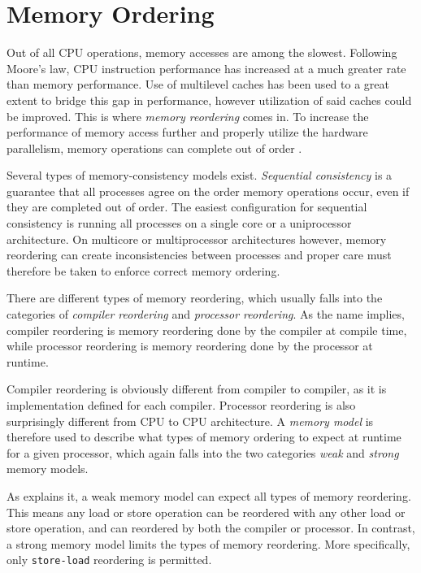 \section{Memory Ordering}
\label{sec:memory_ordering}

Out of all CPU operations, memory accesses are among the slowest. Following Moore's law, CPU instruction performance has increased at a much greater rate than memory performance. Use of multilevel caches has been used to a great extent to bridge this gap in performance, however utilization of said caches could be improved. This is where \textit{memory reordering} comes in. To increase the performance of memory access further and properly utilize the hardware parallelism, memory operations can complete out of order \citep{mckenney2007memory}.

Several types of memory\hyp{}consistency models exist. \textit{Sequential consistency} is a guarantee that all processes agree on the order memory operations occur, even if they are completed out of order. The easiest configuration for sequential consistency is running all processes on a single core or a uniprocessor architecture. On multicore or multiprocessor architectures however, memory reordering can create inconsistencies between processes and proper care must therefore be taken to enforce correct memory ordering. 

There are different types of memory reordering, which usually falls into the categories of \textit{compiler reordering} and \textit{processor reordering}. As the name implies, compiler reordering is memory reordering done by the compiler at compile time, while processor reordering is memory reordering done by the processor at runtime.

Compiler reordering is obviously different from compiler to compiler, as it is implementation defined for each compiler. Processor reordering is also surprisingly different from CPU to CPU architecture. A \textit{memory model} is therefore used to describe what types of memory ordering to expect at runtime for a given processor, which again falls into the two categories \textit{weak} and \textit{strong} memory models.

As \citet{preshing2012weakstrong} explains it, a weak memory model can expect all types of memory reordering. This means any load or store operation can be reordered with any other load or store operation, and can reordered by both the compiler or processor. In contrast, a strong memory model limits the types of memory reordering. More specifically, only \texttt{store\hyp{}load} reordering is permitted. 


